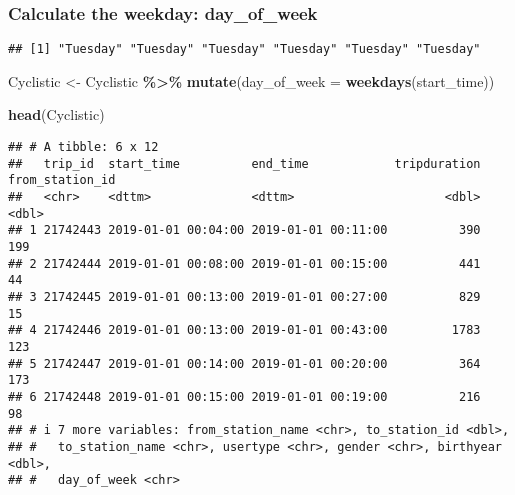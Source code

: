 \documentclass[
]{article}
\newenvironment{Shaded}{\begin{snugshade}}{\end{snugshade}}
\newcommand{\AttributeTok}[1]{\textcolor[rgb]{0.13,0.29,0.53}{#1}}
\newcommand{\FunctionTok}[1]{\textcolor[rgb]{0.13,0.29,0.53}{\textbf{#1}}}
\newcommand{\NormalTok}[1]{#1}
\newcommand{\OtherTok}[1]{\textcolor[rgb]{0.56,0.35,0.01}{#1}}
\newcommand{\SpecialCharTok}[1]{\textcolor[rgb]{0.81,0.36,0.00}{\textbf{#1}}}
\begin{document}
\hypertarget{calculate-the-weekday-day_of_week}{%
\subsubsection{Calculate the weekday:
day\_of\_week}\label{calculate-the-weekday-day_of_week}}

\begin{Shaded}
\end{Shaded}

\begin{verbatim}
## [1] "Tuesday" "Tuesday" "Tuesday" "Tuesday" "Tuesday" "Tuesday"
\end{verbatim}

\begin{Shaded}
\begin{Highlighting}[]
\NormalTok{Cyclistic }\OtherTok{\textless{}{-}}\NormalTok{ Cyclistic }\SpecialCharTok{\%\textgreater{}\%} 
  \FunctionTok{mutate}\NormalTok{(}\AttributeTok{day\_of\_week =} \FunctionTok{weekdays}\NormalTok{(start\_time))}
\end{Highlighting}
\end{Shaded}

\begin{Shaded}
\begin{Highlighting}[]
\FunctionTok{head}\NormalTok{(Cyclistic)}
\end{Highlighting}
\end{Shaded}

\begin{verbatim}
## # A tibble: 6 x 12
##   trip_id  start_time          end_time            tripduration from_station_id
##   <chr>    <dttm>              <dttm>                     <dbl>           <dbl>
## 1 21742443 2019-01-01 00:04:00 2019-01-01 00:11:00          390             199
## 2 21742444 2019-01-01 00:08:00 2019-01-01 00:15:00          441              44
## 3 21742445 2019-01-01 00:13:00 2019-01-01 00:27:00          829              15
## 4 21742446 2019-01-01 00:13:00 2019-01-01 00:43:00         1783             123
## 5 21742447 2019-01-01 00:14:00 2019-01-01 00:20:00          364             173
## 6 21742448 2019-01-01 00:15:00 2019-01-01 00:19:00          216              98
## # i 7 more variables: from_station_name <chr>, to_station_id <dbl>,
## #   to_station_name <chr>, usertype <chr>, gender <chr>, birthyear <dbl>,
## #   day_of_week <chr>
\end{verbatim}
\end{document}
